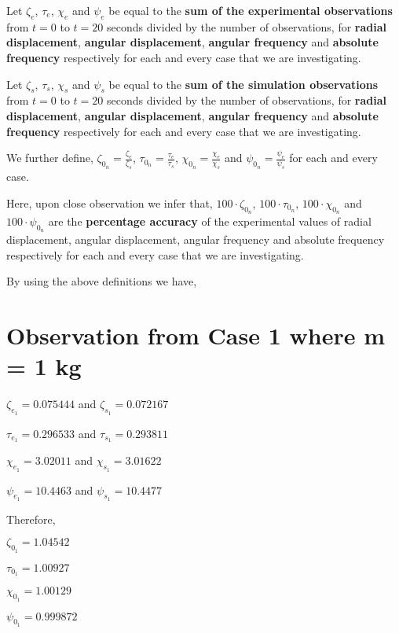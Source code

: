 {Let $\zeta_e$, $\tau_e$, $\chi_e$ and $\psi_e$ be equal to the \textbf{sum of the experimental observations} from $t = 0$ to $t = 20$ seconds divided by the number of observations, for \textbf{radial displacement}, \textbf{angular displacement}, \textbf{angular frequency} and \textbf{absolute frequency} respectively for each and every case that we are investigating.} 

{Let $\zeta_s$, $\tau_s$, $\chi_s$ and $\psi_s$ be equal to the \textbf{sum of the simulation observations} from $t = 0$ to $t = 20$ seconds divided by the number of observations, for \textbf{radial displacement}, \textbf{angular displacement}, \textbf{angular frequency} and \textbf{absolute frequency} respectively for each and every case that we are investigating.}

{We further define, $\zeta_{0_n} = \frac{\zeta_e}{\zeta_s}$, $\tau_{0_n} = \frac{\tau_e}{\tau_s}$, $\chi_{0_n} = \frac{\chi_e}{\chi_s}$ and $\psi_{0_n} = \frac{\psi_e}{\psi_s}$ for each and every case.}

{Here, upon close observation we infer that, $100\cdot\zeta_{0_n}$, $100\cdot\tau_{0_n}$, $100\cdot\chi_{0_n}$ and $100\cdot\psi_{0_n}$ are the \textbf{percentage accuracy} of the experimental values of radial displacement, angular displacement, angular frequency and absolute frequency respectively for each and every case that we are investigating.}

{By using the above definitions we have,}

\section{{Observation from Case 1 where m = 1 kg}}
        
    {$\zeta_{e_1} = 0.075444$ and $\zeta_{s_1} = 0.072167$}
            
    {$\tau_{e_1} = 0.296533$ and $\tau_{s_1} = 0.293811$}
            
    {$\chi_{e_1} = 3.02011$ and $\chi_{s_1} = 3.01622$}
            
    {$\psi_{e_1} = 10.4463$ and $\psi_{s_1} = 10.4477$}
            
    {Therefore,}
            
    $\zeta_{0_1} = 1.04542$
            
    $\tau_{0_1} = 1.00927$
            
    $\chi_{0_1} = 1.00129$
            
    $\psi_{0_1} = 0.999872$    
            
